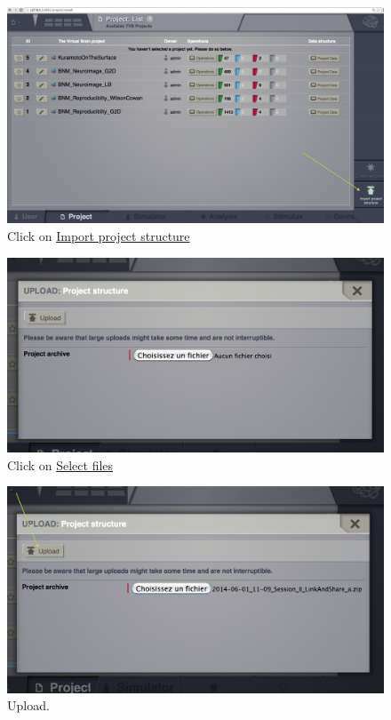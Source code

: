 \documentclass{tufte-handout}
\begin{document}
\begin{figure}
  \includegraphics[width=\linewidth]{Handout_UI_ImportingProjects_Import}%
  \caption{Click on \underline{Import project structure}}%
  \label{fig:import}%
\end{figure}

\begin{figure}
  \includegraphics[width=\linewidth]{Handout_UI_ImportingProjects_ImportOverlay}%
  \caption{Click on \underline{Select files}}%
  \label{fig:importoverlay}%
\end{figure}

\begin{figure}
  \includegraphics[width=\linewidth]{Handout_UI_ImportingProjects_Upload}%
  \caption{Upload.}%
  \label{fig:importupload}%
\end{figure}
\end{document}
